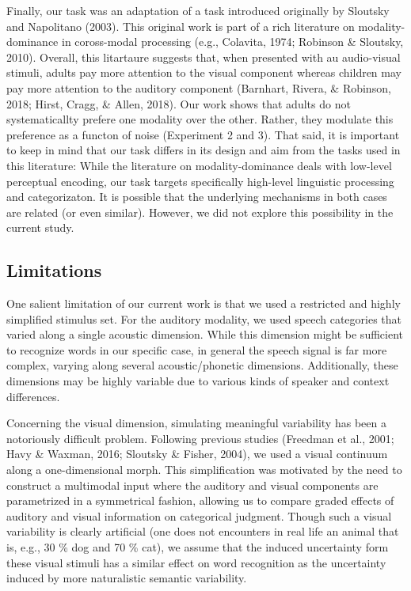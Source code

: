 \documentclass[english,,man,floatsintext]{apa6}
\theoremstyle{definition}
\theoremstyle{definition}
\theoremstyle{definition}
\theoremstyle{remark}
\begin{document}
Finally, our task was an adaptation of a task introduced originally by
Sloutsky and Napolitano (2003). This original work is part of a rich
literature on modality-dominance in coross-modal processing (e.g.,
Colavita, 1974; Robinson \& Sloutsky, 2010). Overall, this litartaure
suggests that, when presented with au audio-visual stimuli, adults pay
more attention to the visual component whereas children may pay more
attention to the auditory component (Barnhart, Rivera, \& Robinson,
2018; Hirst, Cragg, \& Allen, 2018). Our work shows that adults do not
systematicallty prefere one modality over the other. Rather, they
modulate this preference as a functon of noise (Experiment 2 and 3).
That said, it is important to keep in mind that our task differs in its
design and aim from the tasks used in this literature: While the
literature on modality-dominance deals with low-level perceptual
encoding, our task targets specifically high-level linguistic processing
and categorizaton. It is possible that the underlying mechanisms in both
cases are related (or even similar). However, we did not explore this
possibility in the current study.

\subsection{Limitations}\label{limitations}

One salient limitation of our current work is that we used a restricted
and highly simplified stimulus set. For the auditory modality, we used
speech categories that varied along a single acoustic dimension. While
this dimension might be sufficient to recognize words in our specific
case, in general the speech signal is far more complex, varying along
several acoustic/phonetic dimensions. Additionally, these dimensions may
be highly variable due to various kinds of speaker and context
differences.

Concerning the visual dimension, simulating meaningful variability has
been a notoriously difficult problem. Following previous studies
(Freedman et al., 2001; Havy \& Waxman, 2016; Sloutsky \& Fisher, 2004),
we used a visual continuum along a one-dimensional morph. This
simplification was motivated by the need to construct a multimodal input
where the auditory and visual components are parametrized in a
symmetrical fashion, allowing us to compare graded effects of auditory
and visual information on categorical judgment. Though such a visual
variability is clearly artificial (one does not encounters in real life
an animal that is, e.g., 30 \% dog and 70 \% cat), we assume that the
induced uncertainty form these visual stimuli has a similar effect on
word recognition as the uncertainty induced by more naturalistic
semantic variability.
\end{document}
